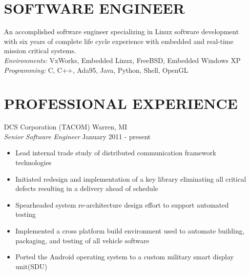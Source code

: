 \documentclass[line]{res}
\begin{document}
\address{San Mateo, CA}
\address{mathew.prokos@gmail.com}

\begin{resume}
\section{SOFTWARE ENGINEER}
    \vspace{1mm}
    An accomplished software engineer specializing in Linux software
    development with six years of complete life cycle experience with
    embedded and real-time mission critical systems.\\

    \vspace{-5mm}
    {\sl Environments:} VxWorks, Embedded Linux, FreeBSD, Embedded Windows XP\\
    {\sl Programming:} C, C++, Ada95, Java, Python, Shell, OpenGL\\

\section{PROFESSIONAL EXPERIENCE}
    \vspace{1mm}
    DCS Corporation (TACOM)  \hfill Warren, MI\\
    {\sl Senior Software Engineer} \hfill January 2011 - present
    \vspace{1mm}
    \begin{itemize} 
       \item Lead internal trade study of distributed communication framework
       technologies
       \item Initiated redesign and implementation of a key library eliminating all critical defects resulting in a delivery ahead of schedule
       \item Spearheaded system re-architecture design effort to support automated testing 
       \item Implemented a cross platform build environment used to automate
       building, packaging, and testing of all vehicle software 
       \item Ported the Android operating system to a custom military smart display unit(SDU) 
    \end{itemize}


\end{resume}
\end{document}
